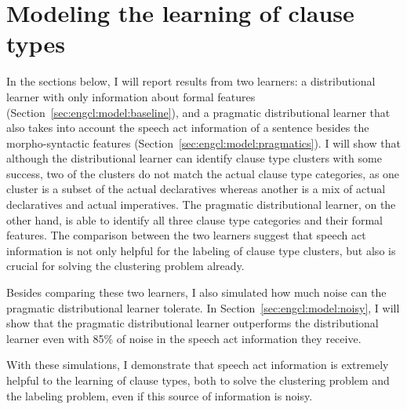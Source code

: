 \section{Modeling the learning of clause types}
\label{sec:engcl:model}

In the sections below, I will report results from two learners: a distributional learner with only information about formal features (Section~\ref{sec:engcl:model:baseline}), and a pragmatic distributional learner that also takes into account the speech act information of a sentence besides the morpho-syntactic features (Section~\ref{sec:engcl:model:pragmatics}). I will show that although the distributional learner can identify clause type clusters with some success, two of the clusters do not match the actual clause type categories, as one cluster is a subset of the actual declaratives whereas another is a mix of actual declaratives and actual imperatives. The pragmatic distributional learner, on the other hand, is able to identify all three clause type categories and their formal features. The comparison between the two learners suggest that speech act information is not only helpful for the labeling of clause type clusters, but also is crucial for solving the clustering problem already. 

Besides comparing these two learners, I also simulated how much noise can the pragmatic distributional learner tolerate. In Section~\ref{sec:engcl:model:noisy}, I will show that the pragmatic distributional learner outperforms the distributional learner even with 85\% of noise in the speech act information they receive. 

With these simulations, I demonstrate that speech act information is extremely helpful to the learning of clause types, both to solve the clustering problem and the labeling problem, even if this source of information is noisy.









